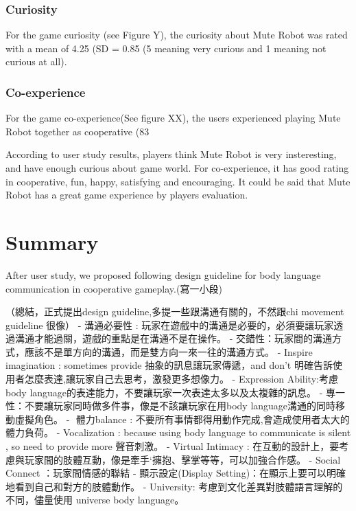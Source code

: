 \documentclass{sigchi}
\begin{document}
\subsubsection{Curiosity}
For the game curiosity (see Figure Y), the curiosity about Mute Robot was rated with a mean of 4.25 (SD = 0.85 (5 meaning very curious and 1 meaning not curious at all).

\subsubsection{Co-experience}

For the game co-experience(See figure XX), the users experienced playing Mute Robot together as cooperative (83%


According to user study results, players think Mute Robot is very insteresting, and have enough curious about game world. For co-experience, it has good rating in cooperative, fun, happy, satisfying and encouraging. It could be said that Mute Robot has a great game experience by players evaluation.

\section{Summary}

After user study, we proposed following design guideline for body language communication in cooperative gameplay.(寫一小段)

（總結，正式提出design guideline,多提一些跟溝通有關的，不然跟chi movement guideline 很像）
-  溝通必要性 : 玩家在遊戲中的溝通是必要的，必須要讓玩家透過溝通才能過關，遊戲的重點是在溝通不是在操作。
- 交錯性：玩家間的溝通方式，應該不是單方向的溝通，而是雙方向一來一往的溝通方式。
-  Inspire imagination : sometimes provide 抽象的訊息讓玩家傳遞，and don’t 明確告訴使用者怎麼表達,讓玩家自己去思考，激發更多想像力。
-­ Expression Ability:考慮body language的表達能力，不要讓玩家一次表達太多以及太複雜的訊息。
-  專一性：不要讓玩家同時做多件事，像是不該讓玩家在用body language溝通的同時移動虛擬角色。
- ­ 體力balance : 不要所有事情都得用動作完成,會造成使用者太大的體力負荷。
­- Vocalization : because using body language to communicate is silent , so need to provide more 聲音刺激。
- Virtual Intimacy : 在互動的設計上，要考慮與玩家間的肢體互動，像是牽手‘擁抱、擊掌等等，可以加強合作感。
- Social Connect ：玩家間情感的聯結
- 顯示設定(Display Setting)：在顯示上要可以明確地看到自己和對方的肢體動作。
- University: 考慮到文化差異對肢體語言理解的不同，儘量使用 universe body language。
\end{document}
